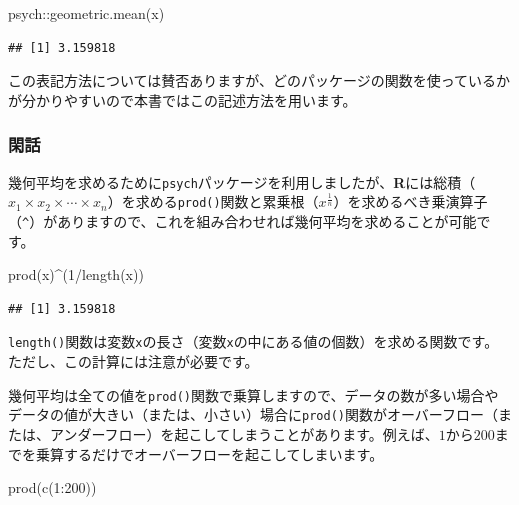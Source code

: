 \documentclass[
  12pt,
]{book}
\newenvironment{Shaded}{\begin{snugshade}}{\end{snugshade}}
\newcommand{\DecValTok}[1]{\textcolor[rgb]{0.00,0.00,0.81}{#1}}
\newcommand{\FunctionTok}[1]{\textcolor[rgb]{0.00,0.00,0.00}{#1}}
\newcommand{\NormalTok}[1]{#1}
\newcommand{\SpecialCharTok}[1]{\textcolor[rgb]{0.00,0.00,0.00}{#1}}
\begin{document}
\begin{Shaded}
\begin{Highlighting}[]
\NormalTok{psych}\SpecialCharTok{::}\FunctionTok{geometric.mean}\NormalTok{(x)}
\end{Highlighting}
\end{Shaded}

\begin{verbatim}
## [1] 3.159818
\end{verbatim}

この表記方法については賛否ありますが、どのパッケージの関数を使っているかが分かりやすいので本書ではこの記述方法を用います。

\hypertarget{ux9591ux8a71}{%
\subsubsection*{閑話}\label{ux9591ux8a71}}

幾何平均を求めるために\texttt{psych}パッケージを利用しましたが、\textbf{R}には総積（\(x_1 \times x_2 \times \cdots \times x_n\)）を求める\texttt{prod()}関数と累乗根（\(x^{\frac{1}{n}}\)）を求めるべき乗演算子（\texttt{\^{}}）がありますので、これを組み合わせれば幾何平均を求めることが可能です。

\begin{Shaded}
\begin{Highlighting}[]
\FunctionTok{prod}\NormalTok{(x)}\SpecialCharTok{\^{}}\NormalTok{(}\DecValTok{1}\SpecialCharTok{/}\FunctionTok{length}\NormalTok{(x))}
\end{Highlighting}
\end{Shaded}

\begin{verbatim}
## [1] 3.159818
\end{verbatim}

\texttt{length()}関数は変数\texttt{x}の長さ（変数\texttt{x}の中にある値の個数）を求める関数です。ただし、この計算には注意が必要です。

幾何平均は全ての値を\texttt{prod()}関数で乗算しますので、データの数が多い場合やデータの値が大きい（または、小さい）場合に\texttt{prod()}関数がオーバーフロー（または、アンダーフロー）を起こしてしまうことがあります。例えば、\(1\)から\(200\)までを乗算するだけでオーバーフローを起こしてしまいます。

\begin{Shaded}
\begin{Highlighting}[]
\FunctionTok{prod}\NormalTok{(}\FunctionTok{c}\NormalTok{(}\DecValTok{1}\SpecialCharTok{:}\DecValTok{200}\NormalTok{))}
\end{Highlighting}
\end{Shaded}
\end{document}
